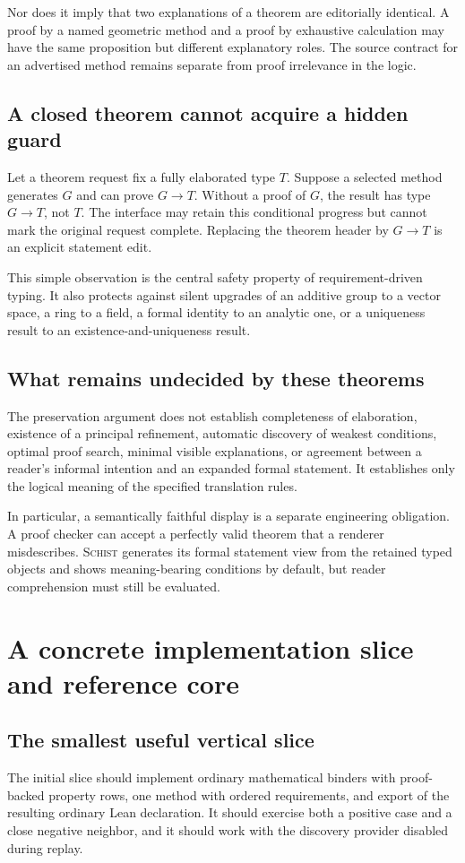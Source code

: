 \documentclass[11pt,a4paper]{article}
\newcommand{\Schist}{\textsc{Schist}}
\theoremstyle{definition}
\begin{document}
Nor does it imply that two explanations of a theorem are editorially identical.
A proof by a named geometric method and a proof by exhaustive calculation may
have the same proposition but different explanatory roles. The source contract
for an advertised method remains separate from proof irrelevance in the logic.

\subsection{A closed theorem cannot acquire a hidden guard}
Let a theorem request fix a fully elaborated type $T$. Suppose a selected
method generates $G$ and can prove $G\to T$. Without a proof of $G$, the result
has type $G\to T$, not $T$. The interface may retain this conditional progress
but cannot mark the original request complete. Replacing the theorem header by
$G\to T$ is an explicit statement edit.

This simple observation is the central safety property of requirement-driven
typing. It also protects against silent upgrades of an additive group to a
vector space, a ring to a field, a formal identity to an analytic one, or a
uniqueness result to an existence-and-uniqueness result.

\subsection{What remains undecided by these theorems}
The preservation argument does not establish completeness of elaboration,
existence of a principal refinement, automatic discovery of weakest conditions,
optimal proof search, minimal visible explanations, or agreement between a
reader's informal intention and an expanded formal statement. It establishes
only the logical meaning of the specified translation rules.

In particular, a semantically faithful display is a separate engineering
obligation. A proof checker can accept a perfectly valid theorem that a renderer
misdescribes. \Schist{} generates its formal statement view from the retained
typed objects and shows meaning-bearing conditions by default, but reader
comprehension must still be evaluated.

\section{A concrete implementation slice and reference core}\label{sec:prototype}
\subsection{The smallest useful vertical slice}
The initial slice should implement ordinary mathematical binders with
proof-backed property rows, one method with ordered requirements, and export
of the resulting ordinary Lean declaration. It should exercise both a positive
case and a close negative neighbor, and it should work with the discovery
provider disabled during replay.
\end{document}
